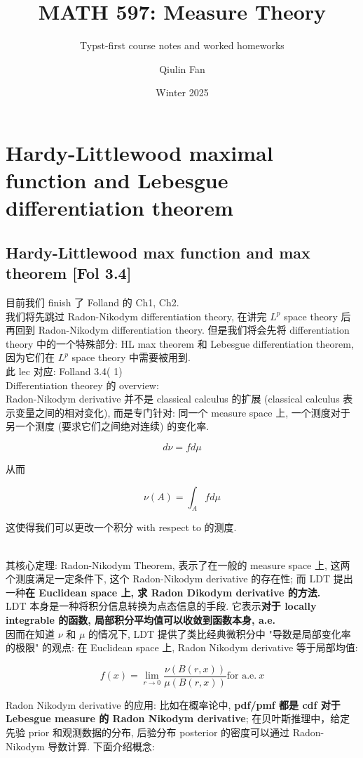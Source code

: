 \documentclass{qlnotes-export}
\title{MATH 597: Measure Theory}
\subtitle{Typst-first course notes and worked homeworks}
\author{Qiulin Fan}
\date{Winter 2025}
\begin{document}
\mainmatter
\chapter{Hardy-Littlewood maximal function and Lebesgue differentiation theorem}\label{hardy-littlewood-maximal-function-and-lebesgue-differentiation-theorem}

\section{Hardy-Littlewood max function and max theorem {[}Fol 3.4{]}}

目前我们 finish 了 Folland 的 Ch1, Ch2.\\
我们将先跳过 Radon-Nikodym differentiation theory, 在讲完 \(L^{p}\) space theory 后再回到 Radon-Nikodym differentiation theory. 但是我们将会先将 differentiation theory 中的一个特殊部分: HL max theorem 和 Lebesgue differentiation theorem, 因为它们在 \(L^{p}\) space theory 中需要被用到.\\
此 lec 对应: Folland 3.4( 1)\\
Differentiation theorey 的 overview:\\
Radon-Nikodym derivative 并不是 classical calculus 的扩展 (classical calculus 表示变量之间的相对变化), 而是专门针对: 同一个 measure space 上, 一个测度对于另一个测度 (要求它们之间绝对连续) 的变化率.

\[d\nu = fd\mu\]

从而

\[\nu(A) = \int_{A}f d\mu\]

这使得我们可以更改一个积分 with respect to 的测度.\\
\strut \\
其核心定理: Radon-Nikodym Theorem, 表示了在一般的 measure space 上, 这两个测度满足一定条件下, 这个 Radon-Nikodym derivative 的存在性; 而 LDT 提出一种\textbf{在 Euclidean space 上, 求 Radon Dikodym derivative 的方法.}\\
LDT 本身是一种将积分信息转换为点态信息的手段. 它表示\textbf{对于 locally integrable 的函数, 局部积分平均值可以收敛到函数本身, a.e.}\\
因而在知道 \(\nu\) 和 \(\mu\) 的情况下, LDT 提供了类比经典微积分中 "导数是局部变化率的极限" 的观点: 在 Euclidean space 上, Radon Nikodym derivative 等于局部均值:

\[f(x) = \lim\limits_{r\rightarrow 0}\frac{\nu(B(r,x))}{\mu(B(r,x))}\text{for a.e.}\ x\]

Radon Nikodym derivative 的应用: 比如在概率论中, \textbf{pdf/pmf 都是 cdf 对于 Lebesgue measure 的 Radon Nikodym derivative}; 在贝叶斯推理中，给定先验 prior 和观测数据的分布, 后验分布 posterior 的密度可以通过 Radon-Nikodym 导数计算. 下面介绍概念:\\
\strut \\
\end{document}
